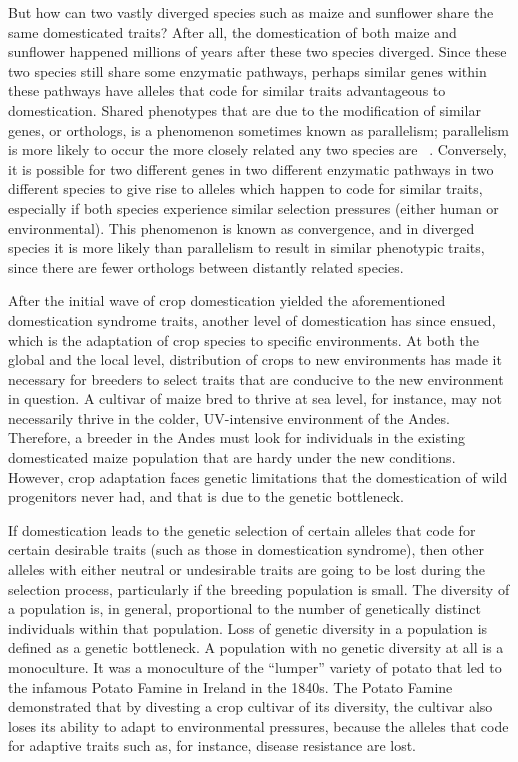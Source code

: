 \documentclass[12pt]{article}
\begin{document}
But how can two vastly diverged species such as maize and sunflower share the same domesticated traits? After all, the domestication of both maize and sunflower happened millions of years after these two species diverged. Since these two species still share some enzymatic pathways, perhaps similar genes within these pathways have alleles that code for similar traits advantageous to domestication. Shared phenotypes that are due to the modification of similar genes, or orthologs, is a phenomenon sometimes known as parallelism; parallelism is more likely to occur the more closely related any two species are ~\cite{Pickersgill2018}. Conversely, it is possible for two different genes in two different enzymatic pathways in two different species to give rise to alleles which happen to code for similar traits, especially if both species experience similar selection pressures (either human or environmental). This phenomenon is known as convergence, and in diverged species it is more likely than parallelism to result in similar phenotypic traits, since there are fewer orthologs between distantly related species.

After the initial wave of crop domestication yielded the aforementioned domestication syndrome traits, another level of domestication has since ensued, which is the adaptation of crop species to specific environments.  At both the global and the local level, distribution of crops to new environments has made it necessary for breeders to select traits that are conducive to the new environment in question. A cultivar of maize bred to thrive at sea level, for instance, may not necessarily thrive in the colder, UV-intensive environment of the Andes.  Therefore, a breeder in the Andes must look for individuals in the existing domesticated maize population that are hardy under the new conditions. However, crop adaptation faces genetic limitations that the domestication of wild progenitors never had, and that is due to the genetic bottleneck. 

If domestication leads to the genetic selection of certain alleles that code for certain desirable traits (such as those in domestication syndrome), then other alleles with either neutral or undesirable traits are going to be lost during the selection process, particularly if the breeding population is small. The diversity of a population is, in general, proportional to the number of genetically distinct individuals within that population. Loss of genetic diversity in a population is defined as a genetic bottleneck. A population with no genetic diversity at all is a monoculture. It was a monoculture of the “lumper” variety of potato that led to the infamous Potato Famine in Ireland in the 1840s.  The Potato Famine demonstrated that by divesting a crop cultivar of its diversity, the cultivar also loses its ability to adapt to environmental pressures, because the alleles that code for adaptive traits such as, for instance, disease resistance are lost.  
\end{document}

